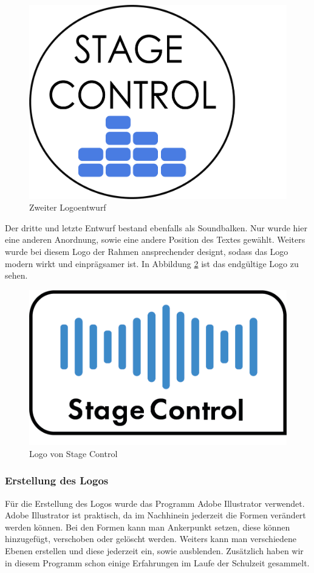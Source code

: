 \begin{figure}[H]
	\centering
	\includegraphics[width=0.5\linewidth]{images/Logoentwurf2.png}
	\caption[Zweiter Logoentwurf]{Zweiter Logoentwurf}
	\label{fig:Logoentwurf2}
\end{figure}

Der dritte und letzte Entwurf bestand ebenfalls als Soundbalken. Nur wurde hier eine anderen Anordnung, sowie eine andere Position des Textes gewählt. Weiters wurde bei diesem Logo der Rahmen ansprechender designt, sodass das Logo modern wirkt und einprägsamer ist. In Abbildung \ref{fig:Logo StageControl} ist das endgültige Logo zu sehen.

\begin{figure}[H]
	\centering
	\includegraphics[width=0.5\linewidth]{images/Logo StageControl.png}
	\caption[Logo von Stage Control]{Logo von Stage Control}
	\label{fig:Logo StageControl}
\end{figure}

\subsubsection{Erstellung des Logos}
Für die Erstellung des Logos wurde das Programm Adobe Illustrator verwendet. Adobe Illustrator ist praktisch, da im Nachhinein jederzeit die Formen verändert werden können. Bei den Formen kann man Ankerpunkt setzen, diese können hinzugefügt, verschoben oder gelöscht werden. Weiters kann man verschiedene Ebenen erstellen und diese jederzeit ein, sowie ausblenden. Zusätzlich haben wir in diesem Programm schon einige Erfahrungen im Laufe der Schulzeit gesammelt. 

